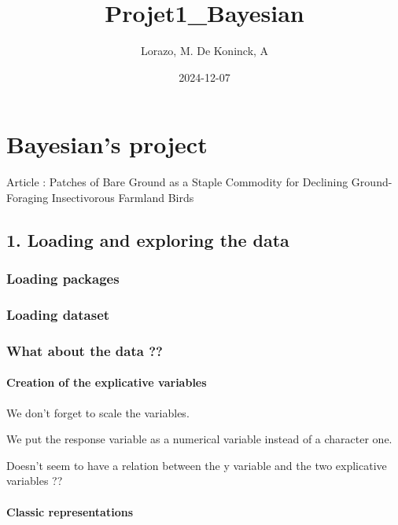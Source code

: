 \documentclass[
]{article}
\title{Projet1\_Bayesian}
\author{Lorazo, M. De Koninck, A}
\date{2024-12-07}
\newenvironment{Shaded}{\begin{snugshade}}{\end{snugshade}}
\newcommand{\DecValTok}[1]{\textcolor[rgb]{0.00,0.00,0.81}{#1}}
\newcommand{\FunctionTok}[1]{\textcolor[rgb]{0.13,0.29,0.53}{\textbf{#1}}}
\newcommand{\NormalTok}[1]{#1}
\newcommand{\OtherTok}[1]{\textcolor[rgb]{0.56,0.35,0.01}{#1}}
\newcommand{\SpecialCharTok}[1]{\textcolor[rgb]{0.81,0.36,0.00}{\textbf{#1}}}
\newcommand{\StringTok}[1]{\textcolor[rgb]{0.31,0.60,0.02}{#1}}
\begin{document}
\maketitle

\section{Bayesian's project}\label{bayesians-project}

Article : Patches of Bare Ground as a Staple Commodity for Declining
Ground-Foraging Insectivorous Farmland Birds

\subsection{1. Loading and exploring the
data}\label{loading-and-exploring-the-data}

\subsubsection{Loading packages}\label{loading-packages}

\subsubsection{Loading dataset}\label{loading-dataset}

\subsubsection{What about the data ??}\label{what-about-the-data}

\paragraph{Creation of the explicative
variables}\label{creation-of-the-explicative-variables}

We don't forget to scale the variables.

We put the response variable as a numerical variable instead of a
character one.

Doesn't seem to have a relation between the y variable and the two
explicative variables ??

\paragraph{Classic representations}\label{classic-representations}

\begin{Shaded}
\end{Shaded}
\end{document}
